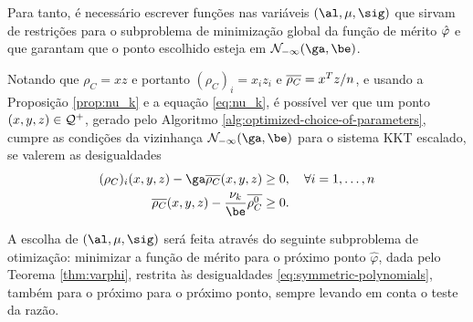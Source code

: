 Para tanto, é necessário  escrever funções nas variáveis
$(\al,\mu,\sig)$ que sirvam de restrições para o subproblema de minimização global da
função de mérito $\hat{\varphi}$ e que garantam que o ponto escolhido esteja em 
$\Nset_{-\infty}(\ga,\be)$. 


Notando  que $\rho_C = xz$ e portanto $(\rho_C)_i = x_iz_i$ e
$\overline{\rho_C} = x^Tz/n$, e usando a Proposição \ref{prop:nu_k} e a equação \eqref{eq:nu_k}, é possível ver que um ponto $(x,y,z)\in\mathcal{Q}^+$, gerado pelo Algoritmo 
\ref{alg:optimized-choice-of-parameters}, cumpre as condições da vizinhança
$\Nset_{-\infty}(\ga,\be)$ para o sistema \ac{KKT} escalado, se valerem as  desigualdades 
\begin{subequations}
\label{eq:symmetric-polynomials}
\begin{align} 
  (\rho_C)_i(x,y,z) -  \ga\dbvec{\rho_C}(x,y,z)  & \geq 0, \quad \forall i=1,\ldots,n %
 \label{eq:symmetric-polynomials-b} \\ 
   \dbvec{\rho_C}(x,y,z) - \frac{\nu_{k}}{\be} \dbvec{\rho_C^0}  &\geq 0 .
 \label{eq:symmetric-polynomials-a}
\end{align} 
\end{subequations}


A escolha de  $(\al,\mu,\sig)$ será feita através do seguinte subproblema de
otimização: minimizar a função de mérito para o próximo ponto $\hat\varphi$,
dada pelo Teorema \ref{thm:varphi}, restrita às desigualdades \eqref{eq:symmetric-polynomials}, também para o próximo
para o próximo ponto,  sempre  levando em conta o
teste da razão.













